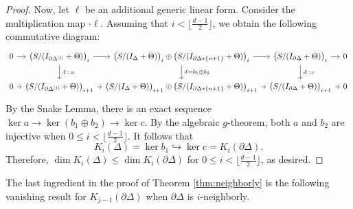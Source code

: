 \documentclass[11pt]{article}
\theoremstyle{definition}
\numberwithin{equation}{theorem}
\begin{document}
\begin{proof}
 Now, let $\ell$ be an additional generic linear form. Consider the multiplication map $\cdot \ell$. Assuming that $i< \lfloor \frac{d-1}{2}\rfloor$, we obtain the following commutative diagram:
    \[\begin{tikzcd}[column sep=tiny]
	0 & {\bigl(S/(I_{\partial\Delta^{[1]}}+\Theta)\bigr)_i} & {\bigl(S/(I_{\Delta}+\Theta)\bigr)_i \oplus \bigl(S/(I_{\partial\Delta*\{n+1\}}+\Theta)\bigr)_i} & {\bigl(S/(I_{\partial\Delta}+\Theta)\bigr)_i} & 0 \\
	0 & {\bigl(S/(I_{\partial\Delta^{[1]}}+\Theta)\bigr)_{i+1}} & {\bigl(S/(I_{\Delta}+\Theta)\bigr)_{i+1} \oplus \bigl(S/(I_{\partial\Delta*\{n+1\}}+\Theta)\bigr)_{i+1}} & {\bigl(S/(I_{\partial\Delta}+\Theta)\bigr)_{i+1}} & 0
	\arrow[from=1-1, to=1-2]
	\arrow[from=1-2, to=1-3]
	\arrow["{\cdot\ell=a}", from=1-2, to=2-2]
	\arrow[from=1-3, to=1-4]
	\arrow["{\cdot\ell=b_1\oplus b_2 }", from=1-3, to=2-3]
	\arrow[from=1-4, to=1-5]
	\arrow["{\cdot\ell=c}", from=1-4, to=2-4]
	\arrow[from=2-1, to=2-2]
	\arrow[from=2-2, to=2-3]
	\arrow[from=2-3, to=2-4]
	\arrow[from=2-4, to=2-5]
    \end{tikzcd}\]
By the Snake Lemma, there is an exact sequence $\ker a \rightarrow \ker (b_1 \oplus b_2) \rightarrow \ker c$. By the algebraic $g$-theorem, both $a$ and $b_2$ are injective when $0\leq i<\lfloor \frac{d-1}{2}\rfloor$. It follows that
    $$K_i(\Delta) = \ker b_1 \hookrightarrow \ker c = K_i(\partial\Delta).$$
    Therefore,  $\dim K_i(\Delta) \leq \dim K_i(\partial\Delta)$ for $0\leq i < \lfloor \frac{d-1}{2}\rfloor$, as desired.
\end{proof}

The last ingredient in the proof of Theorem \ref{thm:neighborly} is the following vanishing result for $K_{j-1}(\partial\Delta)$ when $\partial\Delta$ is $i$-neighborly. 
\end{document}
